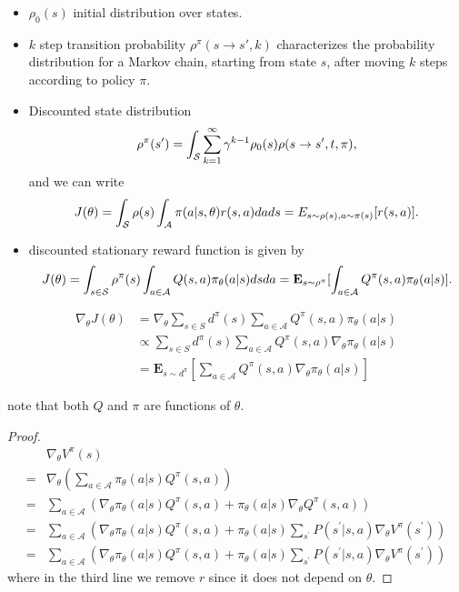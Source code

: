\begin{refsection}
\begin{definition}\hfill
\begin{itemize}
\item $\rho_0(s)$ initial distribution over states.	
\item $k$ step transition probability $\rho^\pi(s\to s',k)$ characterizes the probability distribution for a Markov chain, starting from state $s$, after moving $k$ steps according to policy $\pi$. 
\item Discounted state distribution 
$$\rho^\pi(s') = \int_{\mathcal{S}} \sum_{k=1}^\infty \gamma^{k-1}\rho_0(s)\rho(s\to s',t,\pi),$$
and we can write
$$J(\theta) = \int_{\mathcal{S}} \rho(s)\int_{\mathcal{A}} \pi(a|s,\theta) r(s,a)dads = E_{s\sim \rho(s),a\sim\pi(s)}[r(s,a)].$$	
\item discounted stationary reward function is given by
$$J(\theta) = \int_{s\in \mathcal{S}} \rho^\pi(s) \int_{a\in \mathcal{A}} Q(s, a)\pi_\theta(a|s) ds da = \mathbf{E}_{s\sim \rho^\pi}[\int_{a\in \mathcal{A}} Q^\pi(s,a)\pi_{\theta}(a|s)].$$	
\end{itemize}	
\end{definition}


\begin{theorem}\cite[325]{sutton2018reinforcement}
\begin{align*}
\nabla_\theta J(\theta) &= \nabla_{\theta} \sum_{s \in S} d^{\pi}(s) \sum_{a \in \mathcal{A}} Q^{\pi}(s, a) \pi_{\theta}(a | s)\\
 &\propto \sum_{s \in S} d^{\pi}(s) \sum_{a \in \mathcal{A}} Q^{\pi}(s, a) \nabla_{\theta} \pi_{\theta}(a | s)\\
 &= \mathbf{E}_{s \sim d^\pi}[\sum_{a \in \mathcal{A}} Q^{\pi}(s, a) \nabla_{\theta} \pi_{\theta}(a | s)] 
\end{align*}	

note that both $Q$ and $\pi$ are functions of $\theta$.
\end{theorem}
\begin{proof}
\begin{align*} 
& \nabla_{\theta} V^{\pi}(s) \\
=& \nabla_{\theta}\left(\sum_{a \in \mathcal{A}} \pi_{\theta}(a | s) Q^{\pi}(s, a)\right) \\
=& \sum_{a \in \mathcal{A}}\left(\nabla_{\theta} \pi_{\theta}(a | s) Q^{\pi}(s, a)+\pi_{\theta}(a | s) \nabla_{\theta} Q^{\pi}(s, a)\right) 
\\
=& \sum_{a \in \mathcal{A}}\left(\nabla_{\theta} \pi_{\theta}(a | s) Q^{\pi}(s, a)+\pi_{\theta}(a | s) \sum_{s^{\prime}} P\left(s^{\prime} | s, a\right) \nabla_{\theta} V^{\pi}\left(s^{\prime}\right)\right) \\
=& \sum_{a \in \mathcal{A}}\left(\nabla_{\theta} \pi_{\theta}(a | s) Q^{\pi}(s, a)+\pi_{\theta}(a | s) \sum_{s^{\prime}} P\left(s^{\prime} | s, a\right) \nabla_{\theta} V^{\pi}\left(s^{\prime}\right)\right) 
\end{align*}
where in the third line we remove $r$ since it does not depend on $\theta$.



\end{proof}
\end{refsection}
